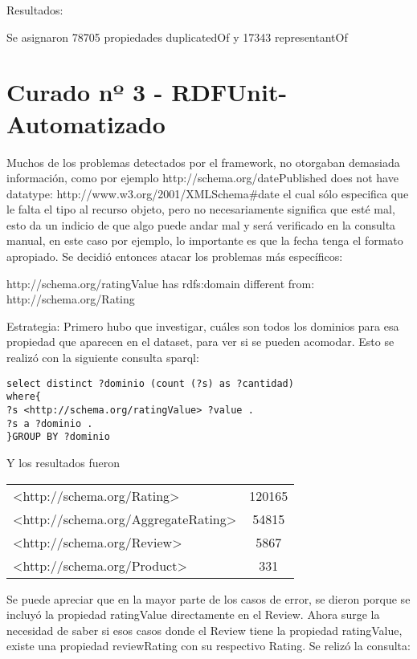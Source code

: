 Resultados:

Se asignaron 78705 propiedades duplicatedOf y 17343 representantOf

\section{Curado nº 3 - RDFUnit-Automatizado}
\label{section:curado-automatizado}

Muchos de los problemas detectados por el framework, no otorgaban demasiada información, como por ejemplo
http://schema.org/datePublished does not have datatype: http://www.w3.org/2001/XMLSchema\#date el cual sólo especifica que le 
falta el tipo al recurso objeto, pero no necesariamente significa que esté mal, esto da un indicio de que algo puede andar mal
y será verificado en la consulta manual, en este caso por ejemplo, lo importante es que la fecha tenga el formato apropiado.
Se decidió entonces atacar los problemas más específicos:

http://schema.org/ratingValue has rdfs:domain different from: http://schema.org/Rating

Estrategia:
Primero hubo que investigar, cuáles son todos los dominios para esa propiedad que aparecen en el dataset, para ver si se pueden 
acomodar. Esto se realizó con la siguiente consulta sparql:

\begin{lstlisting}[frame=single]  
select distinct ?dominio (count (?s) as ?cantidad) 
where{
?s <http://schema.org/ratingValue> ?value .
?s a ?dominio .
}GROUP BY ?dominio
\end{lstlisting}

Y los resultados fueron

\begin{tabular}{| l | c |}
 <http://schema.org/Rating> & 120165\\
 <http://schema.org/AggregateRating> & 54815 \\
 <http://schema.org/Review> & 5867 \\
 <http://schema.org/Product> & 331 \\
\end{tabular}

Se puede apreciar que en la mayor parte de los casos de error, se dieron porque se incluyó la propiedad ratingValue directamente en 
el Review. Ahora surge la necesidad de saber si esos casos donde el Review tiene la propiedad ratingValue, existe una propiedad reviewRating 
con su respectivo Rating.
Se relizó la consulta:

